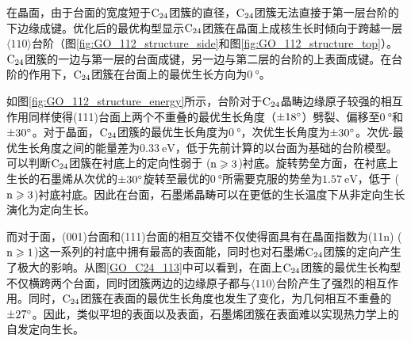 在晶面，由于台面的宽度短于$\rm{C_{24}}$团簇的直径，$\rm{C_{24}}$团簇无法直接于第一层台阶的下边缘成键。优化后的最优构型显示$\rm{C_{24}}$团簇在晶面上成核生长时倾向于跨越一层$\langle 110\rangle$台阶（图\ref{fig:GO_112_structure_side}和图\ref{fig:GO_112_structure_top}）。$\rm{C_{24}}$团簇的一边与第一层的台面成键，另一边与第二层的台阶的上表面成键。在台阶的作用下，$\rm{C_{24}}$团簇在台面上的最优生长方向为$\SI{0}{\degree}$。

如图\ref{fig:GO_112_structure_energy}所示，台阶对于$\rm{C_{24}}$晶畴边缘原子较强的相互作用同样使得(111)台面上两个不重叠的最优生长角度（$\SI{\pm 18 }{\degree}$）劈裂、偏移至$\SI{0}{\degree}$和$\SI{\pm 30 }{\degree}$。对于晶面，$\rm{C_{24}}$团簇的最优生长角度为$\SI{0}{\degree}$，次优生长角度为$\SI{\pm 30 }{\degree}$。次优-最优生长角度之间的能量差为$\SI{0.33}{\electronvolt}$，低于先前计算的以台面为基础的台阶模型。可以判断$\rm{C_{24}}$团簇在衬底上的定向性弱于 ($\rm{n \geqslant 3}$)衬底。旋转势垒方面，在衬底上生长的石墨烯从次优的$\SI{\pm 30 }{\degree}$旋转至最优的$\SI{0}{\degree}$所需要克服的势垒为$\SI{1.57 }{\electronvolt}$，低于 ($\rm{n \geqslant 3}$)衬底衬底。因此在台面，石墨烯晶畴可以在更低的生长温度下从非定向生长演化为定向生长。

而对于面，(001)台面和(111)台面的相互交错不仅使得面具有在晶面指数为(11n) ($\rm{n \geqslant 1}$)这一系列的衬底中拥有最高的表面能，同时也对石墨烯$\rm{C_{24}}$团簇的定向产生了极大的影响。从图\ref{GO_C24_113}中可以看到，在面上$\rm{C_{24}}$团簇的最优生长构型不仅横跨两个台面，同时团簇两边的边缘原子都与$\langle 110\rangle$台阶产生了强烈的相互作用。同时，$\rm{C_{24}}$团簇在表面的最优生长角度也发生了变化，为几何相互不重叠的$\SI{\pm 27 }{\degree}$。因此，类似平坦的表面以及表面，石墨烯团簇在表面难以实现热力学上的自发定向生长。

